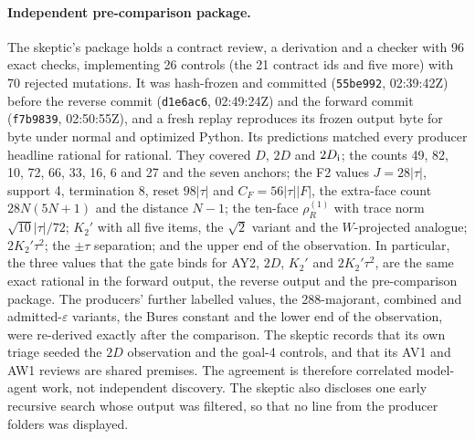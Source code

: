 \paragraph{Independent pre-comparison package.}
The skeptic's package holds a contract review, a derivation and a checker
with 96 exact checks, implementing 26 controls (the 21 contract ids and five
more) with 70 rejected mutations. It was hash-frozen and committed
(\texttt{55be992}, 02:39:42Z) before the reverse commit (\texttt{d1e6ac6},
02:49:24Z) and the forward commit (\texttt{f7b9839}, 02:50:55Z), and a fresh
replay reproduces its frozen output byte for byte under normal and optimized
Python. Its predictions matched every producer headline rational for
rational. They covered $D$, $2D$ and $2D_{\rm i}$; the counts 49, 82, 10, 72,
66, 33, 16, 6 and 27 and the seven anchors; the F2 values $J=28|\tau|$,
support 4, termination 8, reset $98|\tau|$ and $C_F=56|\tau||F|$, the
extra-face count $28N(5N+1)$ and the distance $N-1$; the ten-face
$\rho^{(1)}_R$ with trace norm $\sqrt{10}|\tau|/72$; $K_2'$ with all five
items, the $\sqrt2$ variant and the $W$-projected analogue; $2K_2'\tau^2$;
the $\pm\tau$ separation; and the upper end of the observation. In
particular, the three values that the gate binds for AY2, $2D$, $K_2'$ and
$2K_2'\tau^2$, are the same exact rational in the forward output, the reverse
output and the pre-comparison package. The producers' further labelled
values, the 288-majorant, combined and admitted-$\varepsilon$ variants, the
Bures constant and the lower end of the observation, were re-derived exactly
after the comparison. The skeptic records that its own triage seeded the
$2D$ observation and the goal-4 controls, and that its AV1 and AW1 reviews
are shared premises. The agreement is therefore correlated model-agent work,
not independent discovery. The skeptic also discloses one early recursive
search whose output was filtered, so that no line from the producer folders
was displayed.

